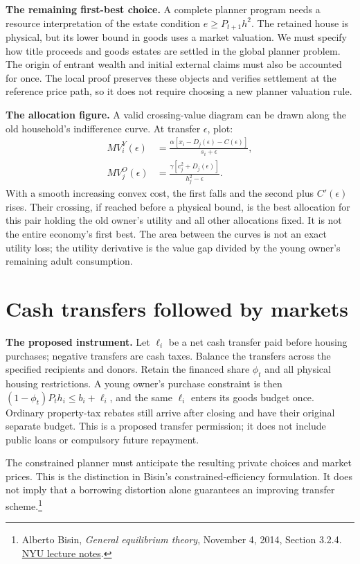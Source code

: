 \documentclass[11pt]{article}
\begin{document}
\textbf{The remaining first-best choice.} A complete planner program needs a
resource interpretation of the estate condition $e\geq P_{t+1}h^2$. The retained
house is physical, but its lower bound in goods uses a market valuation. We
must specify how title proceeds and goods estates are settled in the global
planner problem. The origin of entrant wealth and initial external claims
must also be accounted for once. The local proof preserves these objects and
verifies settlement at the reference price path, so it does not require
choosing a new planner valuation rule.

\textbf{The allocation figure.} A valid crossing-value diagram can be drawn
along the old household's indifference curve. At transfer $\epsilon$, plot:
\begin{align}
 MV_i^Y(\epsilon)&=
 \frac{\alpha[x_i-D_j(\epsilon)-C(\epsilon)]}{s_i+\epsilon},\\
 MV_j^O(\epsilon)&=
 \frac{\gamma[c_j^2+D_j(\epsilon)]}{h_j^2-\epsilon}.
\end{align}
With a smooth increasing convex cost, the first falls and the second plus
$C'(\epsilon)$ rises. Their crossing, if reached before a physical bound, is
the best allocation for this pair holding the old owner's utility and all
other allocations fixed. It is not the entire economy's first best. The area
between the curves is not an exact utility loss; the utility derivative is
the value gap divided by the young owner's remaining adult consumption.

\section{Cash transfers followed by markets}

\textbf{The proposed instrument.} Let $\ell_i$ be a net cash transfer paid before
housing purchases; negative transfers are cash taxes. Balance the transfers
across the specified recipients and donors. Retain the financed share $\phi_t$
and all physical housing restrictions. A young owner's purchase constraint is
then $(1-\phi_t)P_th_i\leq b_i+\ell_i$, and the same $\ell_i$ enters its goods
budget once. Ordinary property-tax rebates still arrive after closing and
have their original separate budget. This is a proposed transfer permission;
it does not include public loans or compulsory future repayment.

The constrained planner must anticipate the resulting private choices and
market prices. This is the distinction in Bisin's constrained-efficiency
formulation. It does not imply that a borrowing distortion alone guarantees
an improving transfer scheme.\footnote{Alberto Bisin, \emph{General equilibrium
theory}, November 4, 2014, Section 3.2.4.
\href{https://bpb-us-e1.wpmucdn.com/wp.nyu.edu/dist/c/16384/files/2019/11/Lecture-notes-Oct2014.pdf}{NYU lecture notes}.}
\end{document}
